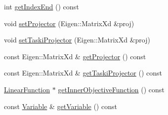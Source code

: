 \begin{DoxyCompactItemize}
\item 
int \hyperlink{classgocra_1_1GHCJTTask_a991e87aba9ef045efe9381a04f26d00b}{get\+Index\+End} () const 
\item 
void \hyperlink{classgocra_1_1GHCJTTask_a391580beeeb10e00c4cd88e9fe241a2c}{set\+Projector} (Eigen\+::\+Matrix\+Xd \&proj)
\item 
void \hyperlink{classgocra_1_1GHCJTTask_a8a6eff40a7476c8715a4cfbac756655e}{set\+Taski\+Projector} (Eigen\+::\+Matrix\+Xd \&proj)
\item 
const Eigen\+::\+Matrix\+Xd \& \hyperlink{classgocra_1_1GHCJTTask_a3c13a47bac8b848ef62f9f15da69fb21}{get\+Projector} () const 
\item 
const Eigen\+::\+Matrix\+Xd \& \hyperlink{classgocra_1_1GHCJTTask_a96305ca577d6b946a8567baa6d1b8270}{get\+Taski\+Projector} () const 
\item 
\hyperlink{classocra_1_1LinearFunction}{Linear\+Function} $\ast$ \hyperlink{classgocra_1_1GHCJTTask_a1ebaa9cede8ae4730945e20bcb1cd3c2}{get\+Inner\+Objective\+Function} () const 
\item 
const \hyperlink{classocra_1_1Variable}{Variable} \& \hyperlink{classgocra_1_1GHCJTTask_a4819e02d5be412ae1f6fc1c218aa7a6e}{get\+Variable} () const 
\end{DoxyCompactItemize}
